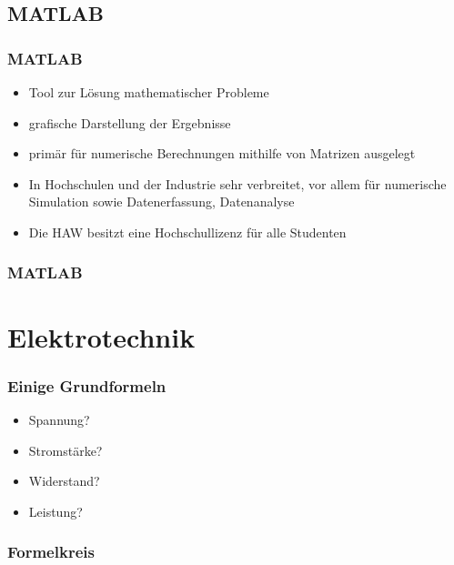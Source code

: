 \documentclass[german,ignorenonframetext]{beamer} %
\begin{document}
\subsection{MATLAB}
\begin{frame}
\frametitle{MATLAB}
\begin{itemize}
\item Tool zur Lösung mathematischer Probleme
\pause
\item grafische Darstellung der Ergebnisse
\pause
\item primär für numerische Berechnungen mithilfe von Matrizen ausgelegt
\pause
\item In Hochschulen und der Industrie sehr verbreitet, vor allem für numerische Simulation sowie Datenerfassung, Datenanalyse
\pause
\item Die HAW besitzt eine Hochschullizenz für alle Studenten
\end{itemize}
\end{frame} 

\begin{frame}
\frametitle{MATLAB}
\end{frame} 

\section{Elektrotechnik}
\begin{frame}
\frametitle{Einige Grundformeln}
\begin{itemize}
\item Spannung?
\item Stromstärke?
\item Widerstand?
\item Leistung?
\end{itemize}
\end{frame} 

\begin{frame}
\frametitle{Formelkreis}
\begin{center}
\end{center}
\end{frame} 
\end{document}
